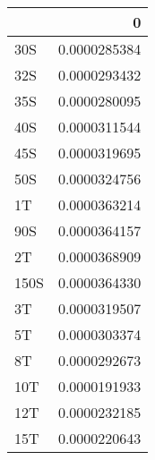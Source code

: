 \begin{tabular}{lr}
\toprule
{} &            0 \\
\midrule
30S  & 0.0000285384 \\
32S  & 0.0000293432 \\
35S  & 0.0000280095 \\
40S  & 0.0000311544 \\
45S  & 0.0000319695 \\
50S  & 0.0000324756 \\
1T   & 0.0000363214 \\
90S  & 0.0000364157 \\
2T   & 0.0000368909 \\
150S & 0.0000364330 \\
3T   & 0.0000319507 \\
5T   & 0.0000303374 \\
8T   & 0.0000292673 \\
10T  & 0.0000191933 \\
12T  & 0.0000232185 \\
15T  & 0.0000220643 \\
\bottomrule
\end{tabular}
